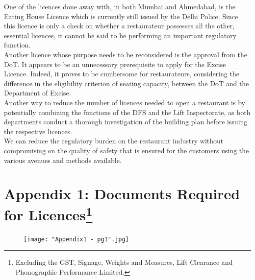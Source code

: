 \documentclass[a4paper, 12pt]{article}
\begin{document}
		One of the licences done away with, in both Mumbai and Ahmedabad, is the Eating House Licence which is currently still issued by the Delhi Police. Since this licence is only a check on whether a restaurateur possesses all the other, essential licences, it 
cannot be said to be performing an important regulatory function.\\
		
		Another licence whose purpose needs to be reconsidered is the approval from the DoT. It appears to be an unnecessary prerequisite to apply for the Excise Licence. Indeed, it proves to be cumbersome for restaurateurs, considering the difference in the 
eligibility criterion of seating capacity, between the DoT and the Department of Excise.\\
		
		Another way to reduce the number of licences needed to open a restaurant is by potentially combining the functions of the DFS and the Lift Inspectorate, as both departments conduct a thorough investigation of the building plan before issuing the 
respective licences.\\
		
		We can reduce the regulatory burden on the restaurant industry without compromising on the quality of safety that is ensured for the customers using the various avenues and methods available.


                 
                          
 \printbibliography[title={Bibliography}]
	
	
	      
        
		\newpage      
		\section*{Appendix 1: Documents Required for Licences\footnote{Excluding the GST, Signage, Weights and Measures, Lift Clearance and Phonographic Performance Limited.}}
		\label {Appendix1}
         
     

         
		\begin{figure}[H]
                    	\centering
                    	\texttt{[image: "Appendix1 - pg1".jpg]} 
		\end{figure}
		
\end{document}
